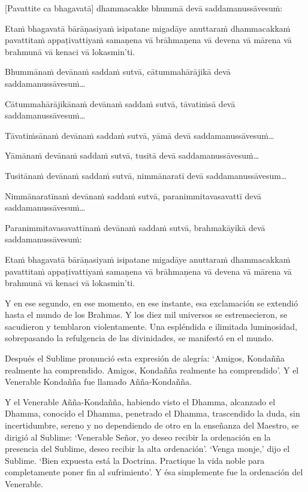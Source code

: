 [Pavattite ca bhagavatā] dhammacakke bhummā devā saddamanussāvesuṁ:

Etaṁ bhagavatā bārāṇasiyaṁ isipatane migadāye anuttaraṁ dhammacakkaṁ
pavattitaṁ appaṭivattiyaṁ samaṇena vā brāhmaṇena vā devena vā mārena vā
brahmunā vā kenaci vā lokasmin'ti.

Bhummānaṁ devānaṁ saddaṁ sutvā, cātummahārājikā devā
saddamanussāvesuṁ\ldots

Cātummahārājikānaṁ devānaṁ saddaṁ sutvā, tāvatiṁsā devā
saddamanussāvesuṁ\ldots

Tāvatiṁsānaṁ devānaṁ saddaṁ sutvā, yāmā devā saddamanussāvesuṁ\ldots

Yāmānaṁ devānaṁ saddaṁ sutvā, tusitā devā saddamanussāvesuṁ\ldots

Tusitānaṁ devānaṁ saddaṁ sutvā, nimmānaratī devā saddamanussāvesum\ldots

Nimmānaratīnaṁ devānaṁ saddaṁ sutvā, paranimmitavasavattī devā
saddamanussāvesuṁ\ldots

Paranimmitavasavattīnaṁ devānaṁ saddaṁ sutvā, brahmakāyikā devā
saddamanussāvesuṁ:

Etaṁ bhagavatā bārāṇasiyaṁ isipatane migadāye anuttaraṁ dhammacakkaṁ
pavattitaṁ appaṭivattiyaṁ samaṇena vā brāhmaṇena vā devena vā mārena vā
brahmunā vā kenaci vā lokasmin'ti.

\clearpage

\englishText
\markboth{\englishTitle}{\rightmark}

Y en ese segundo, en ese momento, en ese instante, esa exclamación se extendió hasta el mundo de los Brahmas. Y los diez mil universos se estremecieron, se sacudieron y temblaron violentamente. Una espléndida e ilimitada luminosidad, sobrepasando la refulgencia de las divinidades, se manifestó en el mundo.

Después el Sublime pronunció esta expresión de alegría: ‘Amigos, Kondañña realmente ha comprendido. Amigos, Kondañña realmente ha comprendido’. Y el Venerable Kondañña fue llamado Añña-Kondañña.

Y el Venerable Añña-Kondañña, habiendo visto el Dhamma, alcanzado el Dhamma, conocido el Dhamma, penetrado el Dhamma, trascendido la duda, sin incertidumbre, sereno y no dependiendo de otro en la enseñanza del Maestro, se dirigió al Sublime: ‘Venerable Señor, yo deseo recibir la ordenación en la presencia del Sublime, deseo recibir la alta ordenación’. ‘Venga monje,’ dijo el Sublime. ‘Bien expuesta está la Doctrina. Practique la vida noble para completamente poner fin al sufrimiento’. Y ésa simplemente fue la ordenación del Venerable.



